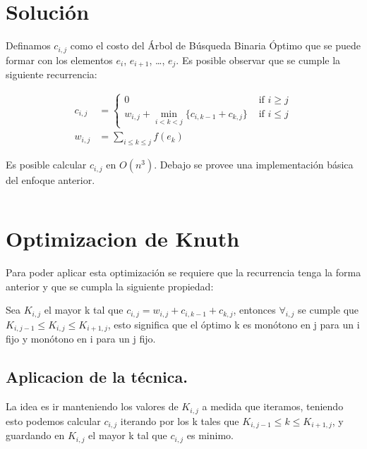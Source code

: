 \documentclass[spanish]{llncs}
\begin{document}
\section{Solución}

Definamos $c_{i,j}$ como el costo del Árbol de Búsqueda Binaria Óptimo que se puede formar
con los elementos $e_i$, $e_{i+1}$, \dots, $e_j$. Es posible observar que se cumple la
siguiente recurrencia:

\begin{align}
	\label{eq:rec:c}
	c_{i,j}                                       & =                           
	\begin{cases}
	0                                             & \text{ if } i \ge j         \\
	w_{i,j} + \min_{i<k<j}\{c_{i,k-1} + c_{k,j}\} & \text{ if } i \le j         
	\end{cases}
	\\
	\label{eq:rec:w}
	w_{i,j}                                       & = \sum_{i \le k\le j}f(e_k) 
\end{align}

Es posible calcular $c_{i,j}$ en $O(n^3)$. Debajo se provee una implementación
básica del enfoque anterior.

\inputminted{python}{basic.py} %

\section{Optimizacion de Knuth}

Para poder aplicar esta optimización se requiere que la recurrencia tenga la forma anterior
y que se cumpla la siguiente propiedad:

\begin{property}
	\label{property:knuth}
	Sea $K_{i,j}$ el mayor k tal que $c_{i,j} = w_{i,j} + c_{i,k-1} + c_{k,j}$,
	entonces $\forall_{i,j}$ se cumple que $K_{i,j-1} \le K_{i,j} \le K_{i+1,j}$,
	esto significa que el óptimo k es monótono en j para un i fijo y monótono
	en i para un j fijo.
\end{property}

\subsection{Aplicacion de la técnica.}
La idea es ir manteniendo los valores de $K_{i,j}$
a medida que iteramos, teniendo esto podemos calcular $c_{i,j}$ iterando por los k tales que
$K_{i,j-1} \le k \le K_{i+1,j}$, y guardando en $K_{i,j}$ el mayor k tal que $c_{i,j}$
es minimo.
\end{document}
